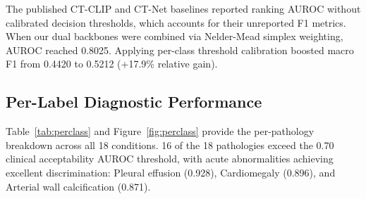 \documentclass[runningheads]{llncs}
\begin{document}
\begin{table}[t]
\centering
\caption{Ablation study on the CT-RATE validation set (3,039 volumes), macro-averaged across all 18 target thoracic pathologies.}
\label{tab:ablation}
\small
{}
\end{table}

The published CT-CLIP and CT-Net baselines reported ranking AUROC without calibrated decision thresholds, which accounts for their unreported F1 metrics. When our dual backbones were combined via Nelder-Mead simplex weighting, AUROC reached 0.8025. Applying per-class threshold calibration boosted macro F1 from 0.4420 to 0.5212 (+17.9\% relative gain).

\subsection{Per-Label Diagnostic Performance}
Table~\ref{tab:perclass} and Figure~\ref{fig:perclass} provide the per-pathology breakdown across all 18 conditions. 16 of the 18 pathologies exceed the 0.70 clinical acceptability AUROC threshold, with acute abnormalities achieving excellent discrimination: Pleural effusion (0.928), Cardiomegaly (0.896), and Arterial wall calcification (0.871).
\end{document}
